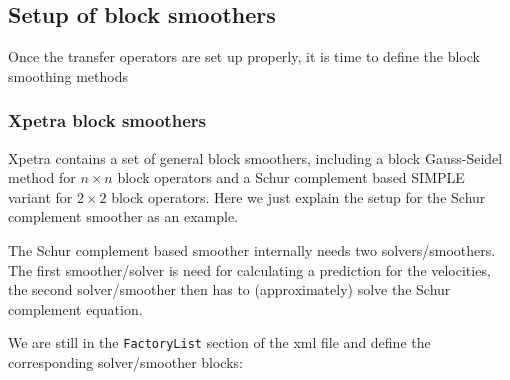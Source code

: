 \documentclass[10pt,fleqn]{book}
\begin{document}
\subsection{Setup of block smoothers}

Once the transfer operators are set up properly, it is time to define the block smoothing methods

\subsubsection{Xpetra block smoothers}

Xpetra contains a set of general block smoothers, including a block Gauss-Seidel method for $n\times n$ block operators and a Schur complement based SIMPLE variant for $2\times 2$ block operators. Here we just explain the setup for the Schur complement smoother as an example.

The Schur complement based smoother internally needs two solvers/smoothers. The first smoother/solver is need for calculating a prediction for the velocities, the second solver/smoother then has to (approximately) solve the Schur complement equation.

We are still in the \texttt{FactoryList} section of the xml file and define the corresponding solver/smoother blocks:
\end{document}
